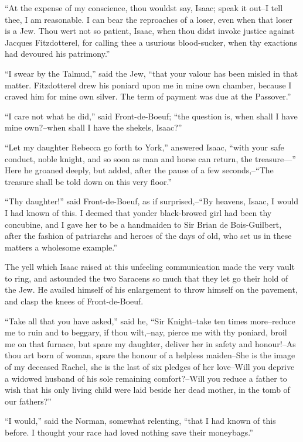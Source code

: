 ``At the expense of my conscience, thou wouldst say, Isaac; speak it
out--I tell thee, I am reasonable. I can bear the reproaches of a loser,
even when that loser is a Jew. Thou wert not so patient, Isaac, when
thou didst invoke justice against Jacques Fitzdotterel, for calling thee
a usurious blood-sucker, when thy exactions had devoured his
patrimony.''

``I swear by the Talmud,'' said the Jew, ``that your valour has been
misled in that matter. Fitzdotterel drew his poniard upon me in mine own
chamber, because I craved him for mine own silver. The term of payment
was due at the Passover.''

``I care not what he did,'' said Front-de-Boeuf; ``the question is, when
shall I have mine own?--when shall I have the shekels, Isaac?''

``Let my daughter Rebecca go forth to York,'' answered Isaac, ``with
your safe conduct, noble knight, and so soon as man and horse can
return, the treasure---'' Here he groaned deeply, but added, after the
pause of a few seconds,--``The treasure shall be told down on this very
floor.''

``Thy daughter!'' said Front-de-Boeuf, as if surprised,--``By heavens,
Isaac, I would I had known of this. I deemed that yonder black-browed
girl had been thy concubine, and I gave her to be a handmaiden to Sir
Brian de Bois-Guilbert, after the fashion of patriarchs and heroes of
the days of old, who set us in these matters a wholesome example.''

The yell which Isaac raised at this unfeeling communication made the
very vault to ring, and astounded the two Saracens so much that they let
go their hold of the Jew. He availed himself of his enlargement to throw
himself on the pavement, and clasp the knees of Front-de-Boeuf.

``Take all that you have asked,'' said he, ``Sir Knight--take ten times
more--reduce me to ruin and to beggary, if thou wilt,--nay, pierce me
with thy poniard, broil me on that furnace, but spare my daughter,
deliver her in safety and honour!--As thou art born of woman, spare the
honour of a helpless maiden--She is the image of my deceased Rachel, she
is the last of six pledges of her love--Will you deprive a widowed
husband of his sole remaining comfort?--Will you reduce a father to wish
that his only living child were laid beside her dead mother, in the tomb
of our fathers?''

``I would,'' said the Norman, somewhat relenting, ``that I had known of
this before. I thought your race had loved nothing save their
moneybags.''

